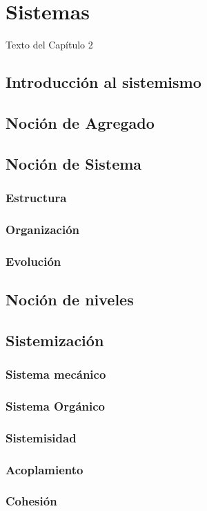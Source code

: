 
\chapter{Sistemas}

Texto del Capítulo 2

\section{Introducción al sistemismo}
\section{Noción de Agregado}
\section{Noción de Sistema}
\subsection{Estructura}
\subsection{Organización}
\subsection{Evolución}
\section{Noción de niveles}
\section{Sistemización}
\subsection{Sistema mecánico}
\subsection{Sistema Orgánico}
\subsection{Sistemisidad}
\subsection{Acoplamiento}
\subsection{Cohesión}

